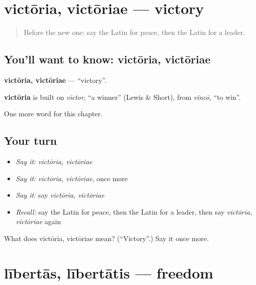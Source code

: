 \section[victōria, victōriae]{victōria, victōriae — victory}

\label{lesson:LA-C187-victoria}



\begin{quote}
Before the new one: say the Latin for peace, then the Latin for a leader.
\end{quote}

\subsection*{You'll want to know: victōria, victōriae}
\textbf{victōria, victōriae} — \textquotedblleft{}victory\textquotedblright{}.

\begin{cousinweb}
\textbf{victōria} is built on \emph{victor}, \textquotedblleft{}a winner\textquotedblright{} (Lewis \& Short), from \emph{vincō}, \textquotedblleft{}to win\textquotedblright{}.
\end{cousinweb}

\begin{grammarlens}[title={What you've built}]
One more word for this chapter.
\end{grammarlens}

\subsection*{Your turn}
\begin{itemize}
\raggedright
  \item \emph{Say it:} \emph{victōria, victōriae}
  \item \emph{Say it:} \emph{victōria, victōriae}, once more
  \item \emph{Say it:} say \emph{victōria, victōriae}
  \item \emph{Recall:} say the Latin for peace, then the Latin for a leader, then say \emph{victōria, victōriae} again
\end{itemize}

\begin{tcolorbox}[breakable,colback=teal!4,colframe=teal!35!black,title={Before you move on}]
What does victōria, victōriae mean? (\textquotedblleft{}Victory\textquotedblright{}.) Say it once more.
\end{tcolorbox}
\section[lībertās, lībertātis]{lībertās, lībertātis — freedom}

